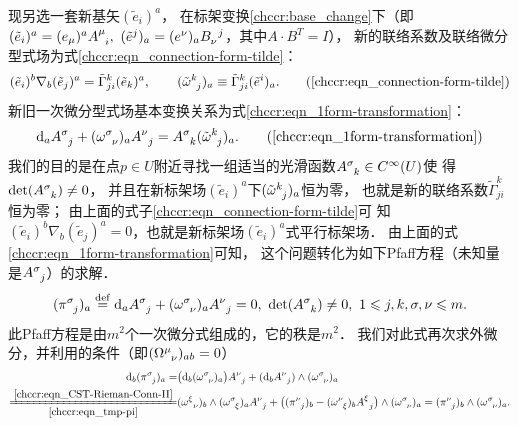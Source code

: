 现另选一套新基矢$(\tilde{e}_i)^a$，
在标架变换\eqref{chccr:base_change}下（即$(\tilde{e} _i)^a = (e_\mu)^{a} A_{\hphantom{\mu} i}^{\mu},\
(\tilde{e} ^j)_a = (e^\nu)_{a} B^{\hphantom{\mu} j}_{\nu}$，其中$A\cdot B^T=I$），
新的联络系数及联络微分型式场为式\eqref{chccr:eqn_connection-form-tilde}：
\begin{equation}
	(\tilde{e}_i)^b \nabla _b (\tilde{e}_j)^a  =
	\tilde{\Gamma}^{k}_{ji} (\tilde{e}_k)^a,   \qquad
	(\tilde{\omega} _{\hphantom{k} j}^{k})_a  \equiv
	\tilde{\Gamma}^{k}_{j i} (\tilde{e}^i)_a .
	\tag{\ref{chccr:eqn_connection-form-tilde}}
\end{equation}
新旧一次微分型式场基本变换关系为式\eqref{chccr:eqn_1form-transformation}：
\begin{equation}
	{\rm d}_a A_{\hphantom{\mu} j}^{\sigma} + (\omega ^{\sigma}_{\hphantom{\mu}\nu})_a  A_{\hphantom{\mu} j}^{\nu}
	=  A_{\hphantom{\mu} k}^{\sigma} (\tilde{\omega} _{\hphantom{k} j} ^{k})_a .
	\tag{\ref{chccr:eqn_1form-transformation}}
\end{equation}
我们的目的是在点$p\in U$附近寻找一组适当的光滑函数$A_{\hphantom{\mu} k}^{\sigma}\in C^\infty(U)$使
得$\det(A_{\hphantom{\mu} k}^{\sigma})\neq 0$，
并且在新标架场$(\tilde{e}_i)^a$下$(\tilde{\omega} _{\hphantom{k} j} ^{k})_a $恒为零，
也就是新的联络系数$\tilde{\Gamma}^{k}_{j i}$恒为零；
由上面的式子\eqref{chccr:eqn_connection-form-tilde}可
知$(\tilde{e}_i)^b \nabla _b (\tilde{e}_j)^a=0$，也就是新标架场$(\tilde{e}_i)^a$式平行标架场．
由上面的式\eqref{chccr:eqn_1form-transformation}可知，
这个问题转化为如下Pfaff方程（未知量是$A_{\hphantom{\mu} j}^{\sigma}$）的求解．
\begin{equation}\label{chccr:eqn_tmp-pi}
	(\pi _{\hphantom{\mu} j} ^{\sigma})_a \overset{\mathrm {def}}{=}
	{\rm d}_a A_{\hphantom{\mu} j}^{\sigma} + (\omega ^{\sigma}_{\hphantom{\mu}\nu})_a  A_{\hphantom{\mu} j}^{\nu}=0,
	\ \det(A_{\hphantom{\mu} k}^{\sigma})\neq 0,\ 1 \leqslant j,k,\sigma,\nu \leqslant m .
\end{equation}
此Pfaff方程是由$m^2$个一次微分式组成的，它的秩是$m^2$．
我们对此式再次求外微分，并利用的条件（即$(\Omega_{\hphantom{\mu} \nu} ^{\mu})_{ab}=0$）
\begin{align*}
	{\rm d}_b(\pi _{\hphantom{\mu} j} ^{\sigma})_a =&
	\bigl({\rm d}_b (\omega ^{\sigma}_{\hphantom{\mu}\nu})_a\bigr)  A_{\hphantom{\mu} j}^{\nu}
	+ ({\rm d}_b  A_{\hphantom{\mu} j}^{\nu}) \wedge (\omega ^{\sigma}_{\hphantom{\mu}\nu})_a   \\
	\xlongequal[\ref{chccr:eqn_tmp-pi}]{\ref{chccr:eqn_CST-Rieman-Conn-II}}&
	( \omega _{\hphantom{\mu} \nu}^\xi )_b \wedge ( \omega _{\hphantom{\mu} \xi}^{\sigma} )_a  A_{\hphantom{\mu} j}^{\nu}
	+ \bigl((\pi _{\hphantom{\mu} j} ^{\nu})_b-(\omega ^{\nu}_{\hphantom{\mu}\xi})_b  A_{\hphantom{\mu} j}^{\xi}\bigr)
	\wedge (\omega ^{\sigma}_{\hphantom{\mu}\nu})_a
	=(\pi _{\hphantom{\mu} j} ^{\nu})_b \wedge (\omega ^{\sigma}_{\hphantom{\mu}\nu})_a  .
\end{align*}
